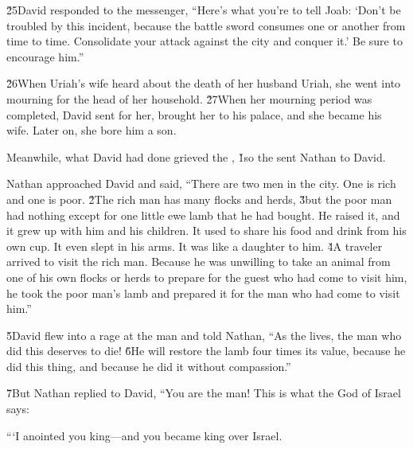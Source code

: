 \v{25}David responded to the messenger, ``Here's what you're to tell Joab: `Don't be troubled by this incident, because the battle sword consumes one or another from time to time. Consolidate your attack against the city and conquer it.' Be sure to encourage him.''

\v{26}When Uriah's wife heard about the death of her husband Uriah, she went into mourning for the head of her household. \v{27}When her mourning period was completed, David sent for her, brought her to his palace, and she became his wife. Later on, she bore him a son.

Meanwhile, what David had done grieved the ,
\v{1}so the  sent Nathan to David.

Nathan approached David and said, ``There are two men in the city. One is rich and one is poor. \v{2}The rich man has many flocks and herds, \v{3}but the poor man had nothing except for one little ewe lamb that he had bought. He raised it, and it grew up with him and his children. It used to share his food and drink from his own cup. It even slept in his arms. It was like a daughter to him. \v{4}A traveler arrived to visit the rich man. Because he was unwilling to take an animal from one of his own flocks or herds to prepare for the guest who had come to visit him, he took the poor man's lamb and prepared it for the man who had come to visit him.''

\v{5}David flew into a rage at the man and told Nathan, ``As the  lives, the man who did this deserves to die! \v{6}He will restore the lamb four times its value, because he did this thing, and because he did it without compassion.''

\v{7}But Nathan replied to David, ``You are the man! This is what the  God of Israel says:

```I anointed you king---and you became king over Israel.

